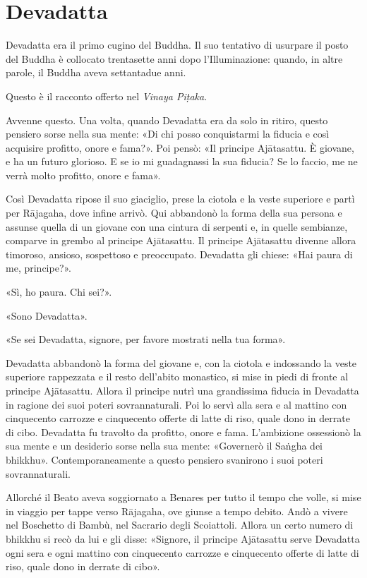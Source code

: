 \chapter{Devadatta}

 Devadatta era il primo cugino del Buddha. Il suo
tentativo di usurpare il posto del Buddha è collocato trentasette anni
dopo l’Illuminazione: quando, in altre parole, il Buddha aveva
settantadue anni.


 Questo è il racconto offerto nel \emph{Vinaya Piṭaka}.


 Avvenne questo. Una volta, quando Devadatta era da solo in
ritiro, questo pensiero sorse nella sua mente: «Di chi posso
conquistarmi la fiducia e così acquisire profitto, onore e fama?». Poi
pensò: «Il principe Ajātasattu. È giovane, e ha un futuro glorioso. E se
io mi guadagnassi la sua fiducia? Se lo faccio, me ne verrà molto
profitto, onore e fama».


Così Devadatta ripose il suo giaciglio, prese la ciotola e la veste
superiore e partì per Rājagaha, dove infine arrivò. Qui abbandonò la
forma della sua persona e assunse quella di un giovane con una cintura
di serpenti e, in quelle sembianze, comparve in grembo al principe
Ajātasattu. Il principe Ajātasattu divenne allora timoroso, ansioso,
sospettoso e preoccupato. Devadatta gli chiese: «Hai paura di me,
principe?».


«Sì, ho paura. Chi sei?».


«Sono Devadatta».


«Se sei Devadatta, signore, per favore mostrati nella tua forma».


Devadatta abbandonò la forma del giovane e, con la ciotola e indossando
la veste superiore rappezzata e il resto dell’abito monastico, si mise
in piedi di fronte al principe Ajātasattu. Allora il principe nutrì una
grandissima fiducia in Devadatta in ragione dei suoi poteri
sovrannaturali. Poi lo servì alla sera e al mattino con cinquecento
carrozze e cinquecento offerte di latte di riso, quale dono in derrate
di cibo. Devadatta fu travolto da profitto, onore e fama. L’ambizione
ossessionò la sua mente e un desiderio sorse nella sua mente: «Governerò
il Saṅgha dei bhikkhu». Contemporaneamente a questo pensiero svanirono i
suoi poteri sovrannaturali.




Allorché il Beato aveva soggiornato a Benares per tutto il tempo che
volle, si mise in viaggio per tappe verso Rājagaha, ove giunse a tempo
debito. Andò a vivere nel Boschetto di Bambù, nel Sacrario degli
Scoiattoli. Allora un certo numero di bhikkhu si recò da lui e gli
disse: «Signore, il principe Ajātasattu serve Devadatta ogni sera e ogni
mattino con cinquecento carrozze e cinquecento offerte di latte di riso,
quale dono in derrate di cibo».


